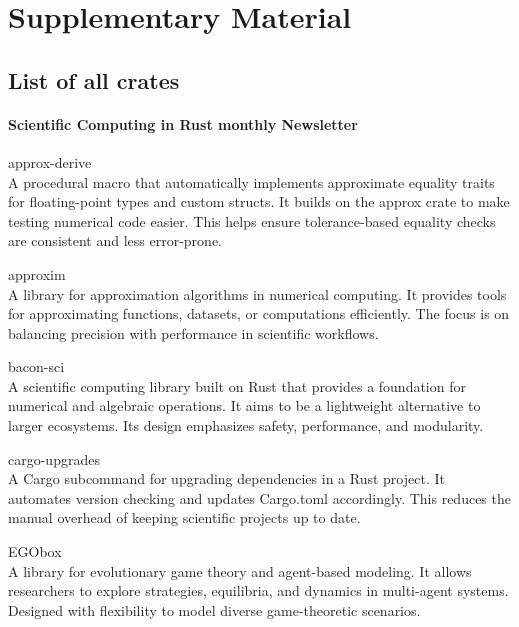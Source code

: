\documentclass{article}
\begin{document}
\pagebreak
{}
\renewcommand{\thesubsection}{S\arabic{supplementSection}}
\newcommand{\supplement}[1]{%
    \stepcounter{supplementSection}%
    \subsection{#1}
}
\renewcommand{\thesection}{}

\section{Supplementary Material}
\supplement{List of all crates}

\paragraph{Scientific Computing in Rust monthly Newsletter}

approx-derive\\
A procedural macro that automatically implements approximate equality traits for
floating-point types and custom structs. It builds on the approx crate to make testing numerical
code easier. This helps ensure tolerance-based equality checks are consistent and less error-prone.

approxim\\
A library for approximation algorithms in numerical computing. It provides tools for
approximating functions, datasets, or computations efficiently. The focus is on balancing precision
with performance in scientific workflows.

bacon-sci\\
A scientific computing library built on Rust that provides a foundation for numerical
and algebraic operations. It aims to be a lightweight alternative to larger ecosystems. Its design
emphasizes safety, performance, and modularity.

cargo-upgrades\\
A Cargo subcommand for upgrading dependencies in a Rust project. It automates
version checking and updates Cargo.toml accordingly. This reduces the manual overhead of keeping
scientific projects up to date.

EGObox\\
A library for evolutionary game theory and agent-based modeling. It allows researchers to
explore strategies, equilibria, and dynamics in multi-agent systems. Designed with flexibility to
model diverse game-theoretic scenarios.
\end{document}
